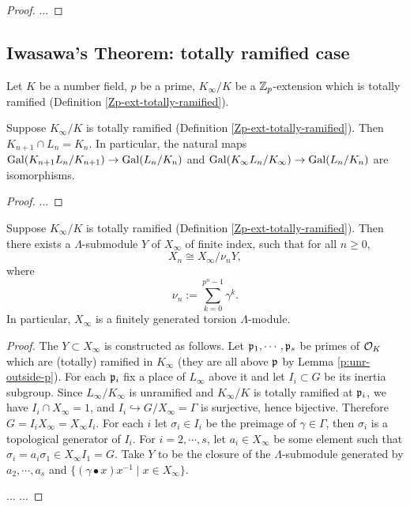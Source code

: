 \begin{proof}
...
\end{proof}

\subsection{Iwasawa's Theorem: totally ramified case}

Let $K$ be a number field, $p$ be a prime,
$K_\infty/K$ be a ${\mathbb {Z}}_p$-extension which is totally ramified
(Definition \ref{Zp-ext-totally-ramified}).

\begin{lem}
\label{isom-of-totally-ramified}
Suppose $K_\infty/K$ is totally ramified
(Definition \ref{Zp-ext-totally-ramified}).
Then $K_{n+1}\cap L_n=K_n$. In particular,
the natural maps
${\mathrm{Gal}}(K_{n+1}L_n/K_{n+1})\to{\mathrm{Gal}}(L_n/K_n)$ and
${\mathrm{Gal}}(K_\infty L_n/K_\infty)\to{\mathrm{Gal}}(L_n/K_n)$
are isomorphisms.
\end{lem}

\begin{proof}
...
\end{proof}

\begin{thm}
\label{Xn-isom-qout-of-totally-ramified}
Suppose $K_\infty/K$ is totally ramified
(Definition \ref{Zp-ext-totally-ramified}).
Then there exists a $\Lambda$-submodule $Y$ of $X_\infty$ of finite index,
such that for all $n\geq 0$,
$$
X_n\cong X_\infty/\nu_nY,
$$
where
$$
\nu_n:=\sum_{k=0}^{p^n-1}\gamma^k.
$$
In particular, $X_\infty$ is a finitely generated torsion $\Lambda$-module.
\end{thm}

\begin{proof}
The $Y\subset X_\infty$ is constructed as follows.
Let ${\mathfrak{p}}_1,\cdots,{\mathfrak{p}}_s$ be primes of ${\mathcal {O}}_K$ which are (totally) ramified in $K_\infty$
(they are all above ${\mathfrak{p}}$ by Lemma \ref{p:unr-outside-p}).
For each ${\mathfrak{p}}_i$ fix a place of $L_\infty$ above it and
let $I_i\subset G$ be its inertia subgroup.
Since $L_\infty/K_\infty$ is unramified
and $K_\infty/K$ is totally ramified at ${\mathfrak{p}}_i$, we have $I_i\cap X_\infty=1$,
and $I_i\hookrightarrow G/X_\infty=\Gamma$ is surjective, hence bijective.
Therefore $G=I_iX_\infty=X_\infty I_i$.
For each $i$ let $\sigma_i\in I_i$ be the preimage of $\gamma\in\Gamma$,
then $\sigma_i$ is a topological generator of $I_i$.
For $i=2,\cdots,s$, let $a_i\in X_\infty$ be some element such that
$\sigma_i=a_i\sigma_1\in X_\infty I_1=G$.
Take $Y$ to be the closure of the $\Lambda$-submodule generated by
$a_2,\cdots,a_s$ and $\{(\gamma\bullet x)x^{-1}\mid x\in X_\infty\}$.

... ...
\end{proof}

